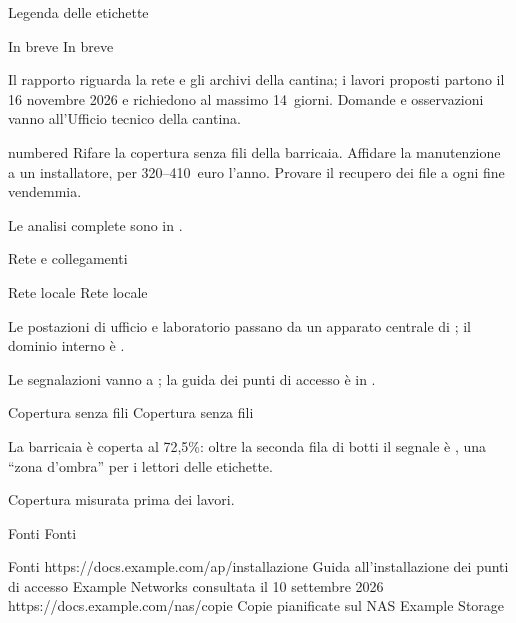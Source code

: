 \documentclass[a4paper,11pt]{article}
\begin{document}
\RdTitlePage
\RdTableOfContents
\begin{RdLegend}{Legenda delle etichette}
\end{RdLegend}


{In breve}
{In breve}

Il rapporto riguarda la rete e gli archivi della cantina; i lavori proposti partono
il 16 novembre 2026 e richiedono al massimo 14~giorni. Domande e osservazioni vanno
all’Ufficio tecnico della cantina.
\par
\begin{RdList}{numbered}
\RdItem Rifare la copertura senza fili della barricaia.
\RdItem Affidare la manutenzione a un installatore, per 320–410~euro l’anno.
\RdItem Provare il recupero dei file a ogni fine vendemmia.
\end{RdList}

Le analisi complete sono in .
\par

{Rete e collegamenti}

{Rete locale}
{Rete locale}

 Le  postazioni di ufficio e laboratorio passano
da un apparato centrale di ; il dominio interno è .
\par

Le segnalazioni vanno a ;
la guida dei punti di accesso è in .
\par

{Copertura senza fili}
{Copertura senza fili}

La barricaia è coperta al 72,5\%: oltre la seconda fila di botti il segnale è ,
una “zona d’ombra” per i lettori delle etichette.
\par
{}
{Copertura misurata prima dei lavori.}

{Fonti}
{Fonti}
\begin{RdSources}{Fonti}
{https:\RdAB{}/\RdAB{}/\RdAB{}docs.\RdAB{}example.\RdAB{}com/\RdAB{}ap/\RdAB{}installazione}
{Guida all’installazione dei punti di accesso}
{Example Networks}
{consultata il 10 settembre 2026}
{https:\RdAB{}/\RdAB{}/\RdAB{}docs.\RdAB{}example.\RdAB{}com/\RdAB{}nas/\RdAB{}copie}
{Copie pianificate sul NAS}
{Example Storage}
{}
\end{RdSources}
\end{document}
